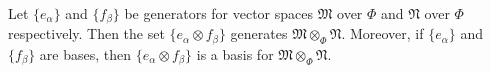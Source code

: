 Let $\{e_\alpha\}$ and $\{f_\beta\}$ be generators for vector spaces $\mathfrak{M}$ over $\Phi$ and $\mathfrak{N}$ over $\Phi$ respectively. Then the set $\{e_\alpha \otimes f_\beta\}$ generates $\mathfrak{M} \otimes_\Phi \mathfrak{N}$. Moreover, if $\{e_\alpha\}$ and $\{f_\beta\}$ are bases, then $\{e_\alpha \otimes f_\beta\}$ is a basis for $\mathfrak{M} \otimes_\Phi \mathfrak{N}$.
